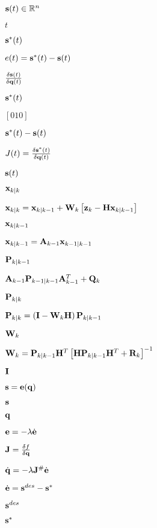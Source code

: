 \documentclass{article}
\begin{document}
${\bf s}(t) \in \mathbb{R}^n $
\pagebreak

$ t $
\pagebreak

${\bf s}^*(t) $
\pagebreak

$ e(t) = {\bf s}^*(t) - {\bf s}(t) $
\pagebreak

$ \frac{\delta {\bf s}(t)}{\delta {\bf q}(t)}$
\pagebreak

$ {\bf s}^*(t) $
\pagebreak

$ [ 0 1 0] $
\pagebreak

$ {\bf s}^*(t) - {\bf s}(t)$
\pagebreak

$ J(t) = \frac{\delta{\bf s}^*(t)}{\delta {\bf q}(t)}$
\pagebreak

$ {\bf s}(t)$
\pagebreak

${\bf x}_{k \mid k} $
\pagebreak

${\bf x}_{k \mid k} = {\bf x}_{k \mid k-1} + {\bf W}_k \left[ {\bf z}_k - {\bf H x}_{k \mid k-1} \right]$
\pagebreak

${\bf x}_{k \mid k-1} $
\pagebreak

$ {{\bf x}}_{k|k-1} = {\bf A}_{k-1} {\bf x}_{k-1\mid k-1}$
\pagebreak

${\bf P}_{k \mid k-1} $
\pagebreak

$ {\bf A}_{k-1} {\bf P}_{k-1 \mid k-1} {\bf A}^T_{k-1} + {\bf Q}_k$
\pagebreak

${\bf P}_{k \mid k}$
\pagebreak

${\bf P}_{k \mid k} = \left({\bf I - W}_k {\bf H} \right) {\bf P}_{k \mid k-1}$
\pagebreak

${\bf W}_k$
\pagebreak

$ {\bf W}_k = {\bf P}_{k \mid k-1} {\bf H}^T \left[ {\bf H P}_{k \mid k-1} {\bf H}^T + {\bf R}_k \right]^{-1}$
\pagebreak

$ \bf I$
\pagebreak

$ {\bf s} ={\bf e}({\bf q}) $
\pagebreak

${\bf s} $
\pagebreak

${\bf q}$
\pagebreak

$ {\bf e} = - \lambda \dot{\bf e} $
\pagebreak

$ {\bf J} = \frac{\delta f}{\delta {\bf q}} $
\pagebreak

$ \dot{\bf q} = -\lambda {\bf J}^{\#} \dot{\bf e}$
\pagebreak

$ \dot{\bf e} = {\bf s}^{des} - {\bf s}^* $
\pagebreak

$ {\bf s}^{des}$
\pagebreak

$ {\bf s}^* $
\pagebreak
\end{document}
